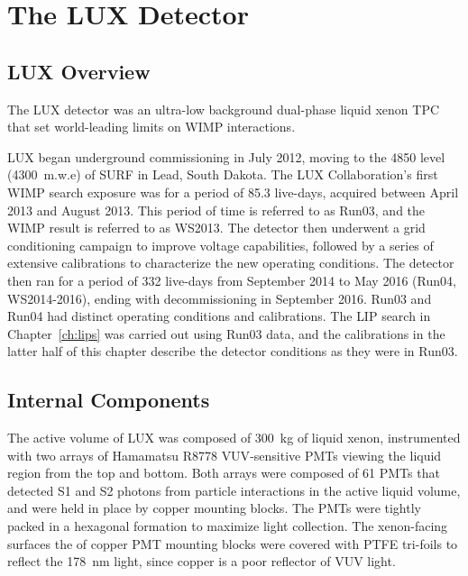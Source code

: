 \chapter{The LUX Detector}

\label{ch:LUX} %

\section{LUX Overview}
The \ac{LUX} detector was an ultra-low background dual-phase liquid xenon \ac{TPC} that set world-leading limits on \ac{WIMP} interactions.
 
\ac{LUX} began underground commissioning in July 2012, moving to the 4850 level (4300~m.w.e) of \ac{SURF} in Lead, South Dakota.  The \ac{LUX} Collaboration's first \ac{WIMP} search exposure was for a period of 85.3 live-days, acquired between April 2013 and August 2013. This period of time is referred to as Run03, and the \ac{WIMP} result is referred to as WS2013. The detector then underwent a grid conditioning campaign to improve voltage capabilities, followed by a series of extensive calibrations to characterize the new operating conditions. The detector then ran for a period of 332 live-days from September 2014 to May 2016 (Run04, WS2014-2016), ending with decommissioning in September 2016. Run03 and Run04 had distinct operating conditions and calibrations. The \ac{LIP} search in Chapter~\ref{ch:lips} was carried out using Run03 data, and the calibrations in the latter half of this chapter describe the detector conditions as they were in Run03. 

\section{Internal Components}
The active volume of \ac{LUX} was composed of 300~kg of liquid xenon, instrumented with two arrays of Hamamatsu R8778 \ac{VUV}-sensitive \ac{PMT}s viewing the liquid region from the top and bottom. Both arrays were composed of 61 \ac{PMT}s that detected S1 and S2 photons from particle interactions in the active liquid volume, and were held in place by copper mounting blocks. The \ac{PMT}s were tightly packed in a hexagonal formation to maximize light collection. The xenon-facing surfaces the of copper \ac{PMT} mounting blocks were covered with \ac{PTFE} tri-foils to reflect the 178~nm light, since copper is a poor reflector of \ac{VUV} light. 

